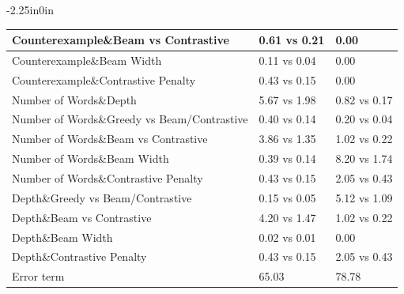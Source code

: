 \begin{table}[h]
\begin{adjustwidth}{-2.25in}{0in}
{\begin{tabular}{|l|l|l|}
\hline
Counterexample\&Beam vs Contrastive & 0.61 vs 0.21 & 0.00 \\
\hline
Counterexample\&Beam Width & 0.11 vs 0.04 & 0.00 \\
\hline
Counterexample\&Contrastive Penalty & 0.43 vs 0.15 & 0.00 \\
\hline
Number of Words\&Depth & 5.67 vs 1.98 & 0.82 vs 0.17 \\
\hline
Number of Words\&Greedy vs Beam/Contrastive & 0.40 vs 0.14 & 0.20 vs 0.04 \\
\hline
Number of Words\&Beam vs Contrastive & 3.86 vs 1.35 & 1.02 vs 0.22 \\
\hline
Number of Words\&Beam Width & 0.39 vs 0.14 & 8.20 vs 1.74 \\
\hline
Number of Words\&Contrastive Penalty & 0.43 vs 0.15 & 2.05 vs 0.43 \\
\hline
Depth\&Greedy vs Beam/Contrastive & 0.15 vs 0.05 & 5.12 vs 1.09 \\
\hline
Depth\&Beam vs Contrastive & 4.20 vs 1.47 & 1.02 vs 0.22 \\
\hline
Depth\&Beam Width & 0.02 vs 0.01 & 0.00 \\
\hline
Depth\&Contrastive Penalty & 0.43 vs 0.15 & 2.05 vs 0.43 \\
\hline
\cellcolor[HTML]{FDE9D9}Error term & 65.03 & 78.78 \\
\hline
\end{tabular}
}
\label{table:algo3_variance_decomposition}
\end{adjustwidth}
\end{table}